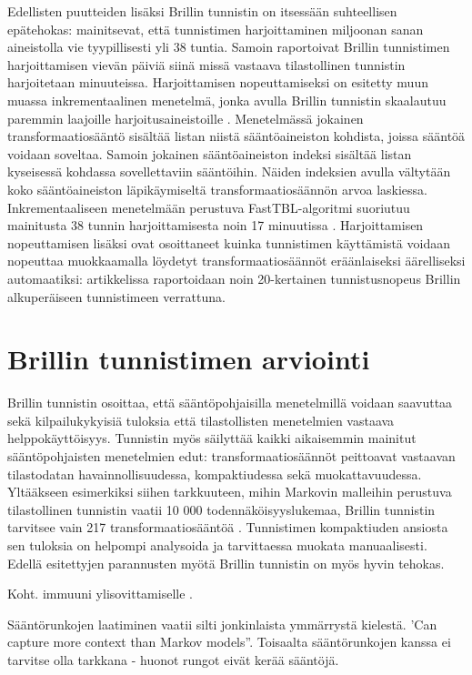\documentclass[utf8,bachelor,manualbib]{gradu3}
\begin{document}
Edellisten puutteiden lisäksi Brillin tunnistin on itsessään suhteellisen epätehokas:  mainitsevat, että tunnistimen harjoittaminen miljoonan sanan aineistolla vie tyypillisesti yli 38 tuntia. Samoin  raportoivat Brillin tunnistimen harjoittamisen vievän päiviä siinä missä vastaava tilastollinen tunnistin harjoitetaan minuuteissa. Harjoittamisen nopeuttamiseksi on esitetty muun muassa inkrementaalinen menetelmä, jonka avulla Brillin tunnistin skaalautuu paremmin laajoille harjoitusaineistoille \citep{ramshaw1994}. Menetelmässä jokainen transformaatiosääntö sisältää listan niistä sääntöaineiston kohdista, joissa sääntöä voidaan soveltaa. Samoin jokainen sääntöaineiston indeksi sisältää listan kyseisessä kohdassa sovellettaviin sääntöihin. Näiden indeksien avulla vältytään koko sääntöaineiston läpikäymiseltä transformaatiosäännön arvoa laskiessa. Inkrementaaliseen menetelmään perustuva FastTBL-algoritmi suoriutuu mainitusta 38 tunnin harjoittamisesta noin 17 minuutissa \citep{ngai2001}. Harjoittamisen nopeuttamisen lisäksi  ovat osoittaneet kuinka tunnistimen käyttämistä voidaan nopeuttaa muokkaamalla löydetyt transformaatiosäännöt eräänlaiseksi äärelliseksi automaatiksi: artikkelissa raportoidaan noin 20-kertainen tunnistusnopeus Brillin alkuperäiseen tunnistimeen verrattuna.

\section{Brillin tunnistimen arviointi}

Brillin tunnistin osoittaa, että sääntöpohjaisilla menetelmillä voidaan saavuttaa sekä kilpailukykyisiä tuloksia että tilastollisten menetelmien vastaava helppokäyttöisyys. Tunnistin myös säilyttää kaikki aikaisemmin mainitut sääntöpohjaisten menetelmien edut: transformaatiosäännöt peittoavat vastaavan tilastodatan havainnollisuudessa, kompaktiudessa sekä muokattavuudessa. Yltääkseen esimerkiksi siihen tarkkuuteen, mihin Markovin malleihin perustuva tilastollinen tunnistin vaatii 10 000 todennäköisyyslukemaa, Brillin tunnistin tarvitsee vain 217 transformaatiosääntöä \citep{brill1994}. Tunnistimen kompaktiuden ansiosta sen tuloksia on helpompi analysoida ja tarvittaessa muokata manuaalisesti. Edellä esitettyjen parannusten myötä Brillin tunnistin on myös hyvin tehokas.

Koht. immuuni ylisovittamiselle \citep{ramshaw1994}.

Sääntörunkojen laatiminen vaatii silti jonkinlaista ymmärrystä kielestä. 'Can capture more context than Markov models''. Toisaalta sääntörunkojen kanssa ei tarvitse olla tarkkana - huonot rungot eivät kerää sääntöjä.
\end{document}

